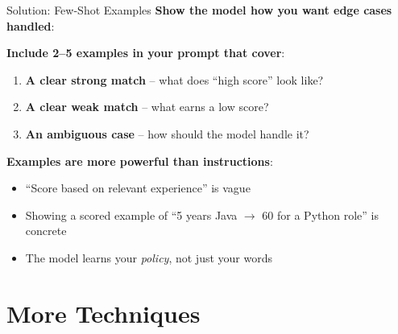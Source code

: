 \documentclass[aspectratio=169]{beamer}
\begin{document}
\begin{frame}{Solution: Few-Shot Examples}
\textbf{Show the model how you want edge cases handled}:
\vspace{0.3cm}

\textbf{Include 2--5 examples in your prompt that cover}:
\begin{enumerate}
    \item \textbf{A clear strong match} -- what does ``high score'' look like?
    \item \textbf{A clear weak match} -- what earns a low score?
    \item \textbf{An ambiguous case} -- how should the model handle it?
\end{enumerate}
\vspace{0.3cm}

\textbf{Examples are more powerful than instructions}:
\begin{itemize}
    \item ``Score based on relevant experience'' is vague
    \item Showing a scored example of ``5 years Java $\rightarrow$ 60 for a Python role'' is concrete
    \item The model learns your \textit{policy}, not just your words
\end{itemize}
\vspace{0.3cm}

\begin{center}
\end{center}
\end{frame}

\section{More Techniques}
\end{document}
